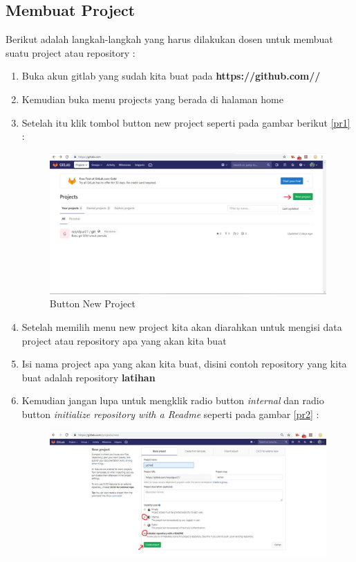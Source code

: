 \subsection{Membuat Project}
Berikut adalah langkah-langkah yang harus dilakukan dosen untuk membuat suatu project atau repository :
\begin{enumerate}
\item Buka akun gitlab yang sudah kita buat pada \textbf{https://github.com//}
\item Kemudian buka menu projects yang berada di halaman home
\item Setelah itu klik tombol button new project seperti pada gambar berikut \ref{pr1} :
\subitem 
\begin{figure}[!htbp]
\centerline{\includegraphics[width=.75\textwidth]{Figures/gitlab/pr1.JPG}}
\caption{Button New Project}
\label{fig:pr1}
\end{figure}
\item Setelah memilih menu new project kita akan diarahkan untuk mengisi data project atau repository apa yang akan kita buat
\item Isi nama project apa yang akan kita buat, disini contoh repository yang kita buat adalah repository \textbf{latihan}
\item Kemudian jangan lupa untuk mengklik radio button \textit{internal} dan radio button \textit{initialize repository with a Readme} seperti pada gambar \ref{pr2} :
\subitem
\begin{figure}[!htbp]
\centerline{\includegraphics[width=.75\textwidth]{Figures/gitlab/pr2.JPG}}

\end{figure}
\end{enumerate}
